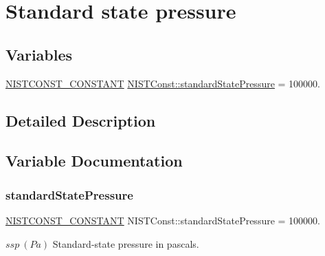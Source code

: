 \hypertarget{group___n_i_s_t_const-_standard_state_pressure}{}\section{Standard state pressure}
\label{group___n_i_s_t_const-_standard_state_pressure}
\subsection*{Variables}
\begin{DoxyCompactItemize}
\item 
\mbox{\hyperlink{group___n_i_s_t_const-_macros_ga2b0fc1d7452373f816175dd86ce26729}{N\+I\+S\+T\+C\+O\+N\+S\+T\+\_\+\+C\+O\+N\+S\+T\+A\+NT}} \mbox{\hyperlink{group___n_i_s_t_const-_standard_state_pressure_gaf350fe751c6d2280b7712dcad3ac025f}{N\+I\+S\+T\+Const\+::standard\+State\+Pressure}} = 100000.
\end{DoxyCompactItemize}


\subsection{Detailed Description}


\subsection{Variable Documentation}
\mbox{\label{group___n_i_s_t_const-_standard_state_pressure_gaf350fe751c6d2280b7712dcad3ac025f}} 
\subsubsection{\texorpdfstring{standard\+State\+Pressure}{standardStatePressure}}
{\footnotesize\ttfamily \mbox{\hyperlink{group___n_i_s_t_const-_macros_ga2b0fc1d7452373f816175dd86ce26729}{N\+I\+S\+T\+C\+O\+N\+S\+T\+\_\+\+C\+O\+N\+S\+T\+A\+NT}} N\+I\+S\+T\+Const\+::standard\+State\+Pressure = 100000.}

$ssp \ (Pa)$ Standard-\/state pressure in pascals. 